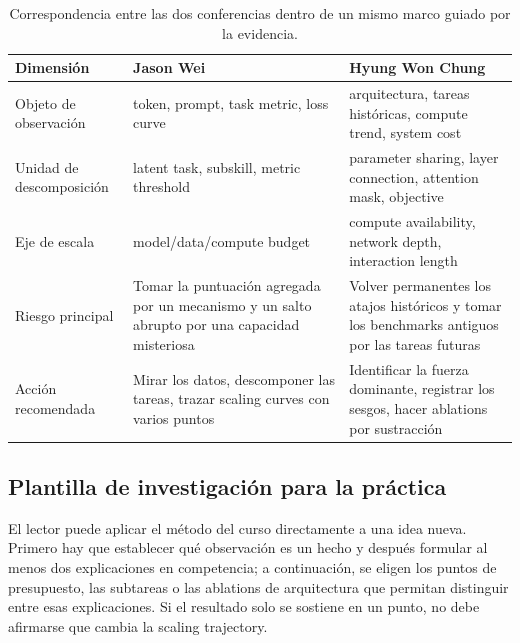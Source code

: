 \begin{table}[H]
\centering
\begin{tabularx}{\textwidth}{L{0.18\textwidth} X X}
\toprule
Dimensión & Jason Wei & Hyung Won Chung \\
\midrule
Objeto de observación & token, prompt, task metric, loss curve & arquitectura, tareas históricas, compute trend, system cost \\
Unidad de descomposición & latent task, subskill, metric threshold & parameter sharing, layer connection, attention mask, objective \\
Eje de escala & model/data/compute budget & compute availability, network depth, interaction length \\
Riesgo principal & Tomar la puntuación agregada por un mecanismo y un salto abrupto por una capacidad misteriosa & Volver permanentes los atajos históricos y tomar los benchmarks antiguos por las tareas futuras \\
Acción recomendada & Mirar los datos, descomponer las tareas, trazar scaling curves con varios puntos & Identificar la fuerza dominante, registrar los sesgos, hacer ablations por sustracción \\
\bottomrule
\end{tabularx}
\caption{Correspondencia entre las dos conferencias dentro de un mismo marco guiado por la evidencia.}
\end{table}

\subsection{Plantilla de investigación para la práctica}

El lector puede aplicar el método del curso directamente a una idea nueva. Primero hay que establecer qué observación es un hecho y después formular al menos dos explicaciones en competencia; a continuación, se eligen los puntos de presupuesto, las subtareas o las ablations de arquitectura que permitan distinguir entre esas explicaciones. Si el resultado solo se sostiene en un punto, no debe afirmarse que cambia la scaling trajectory.

